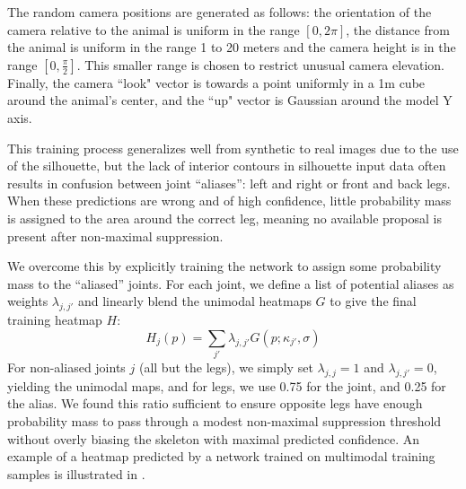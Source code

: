 The random camera positions are generated as follows: the orientation of the camera relative to the animal is uniform in the range $[0, 2\pi]$, the distance from the animal is uniform in the range 1 to 20 meters and the camera height is in the range $[0,\frac{\pi}{2}]$. This smaller range is chosen to restrict unusual camera elevation. Finally, the camera ``look" vector is towards a point uniformly in a 1m cube around the animal's center, and the ``up" vector is Gaussian around the model Y axis.  

This training process generalizes well from synthetic to real images due to the use of the silhouette, but the lack of interior contours in silhouette input data often results in confusion between joint ``aliases'': left and right or front and back legs.  When these predictions are wrong and of high confidence, little probability mass is assigned to the area around the correct leg, meaning no available proposal is present after non-maximal suppression.

We overcome this by explicitly training the network to assign some probability mass to the ``aliased'' joints. For each joint, we define a list of potential aliases as weights $\lambda_{j,j'}$ and linearly blend the unimodal heatmaps $G$ to give the final training heatmap $H$:
\begin{equation}
    H_{j}(p) = \sum_{j'} \lambda_{j,j'} G(p; \kappa_{j'}, \sigma)
\end{equation}
For non-aliased joints $j$ (all but the legs), we simply set $\lambda_{j,j} = 1$ and $\lambda_{j,j'} = 0$, yielding the unimodal maps, and for legs, we use 0.75 for the joint, and 0.25 for the alias.  We found this ratio sufficient to ensure opposite legs have enough probability mass to pass through a modest non-maximal suppression threshold without overly biasing the skeleton with maximal predicted confidence. An example of a heatmap predicted by a network trained on multimodal training samples is illustrated in . 

